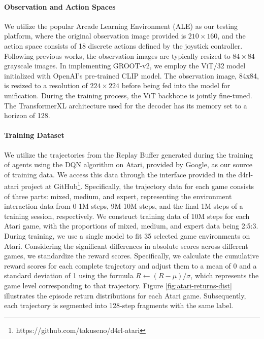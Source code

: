 \paragraph{Observation and Action Spaces} We utilize the popular Arcade Learning Environment (ALE) as our testing platform, where the original observation image provided is $210 \times 160$, and the action space consists of 18 discrete actions defined by the joystick controller. Following previous works, the observation images are typically resized to $84 \times 84$ grayscale images. In implementing GROOT-v2, we employ the ViT/32 model initialized with OpenAI's pre-trained CLIP model. The observation image, 84x84, is resized to a resolution of $224 \times 224$ before being fed into the model for unification. During the training process, the ViT backbone is jointly fine-tuned. The TransformerXL architecture used for the decoder has its memory set to a horizon of 128. 


\paragraph{Training Dataset} We utilize the trajectories from the Replay Buffer generated during the training of agents using the DQN algorithm on Atari, provided by Google, as our source of training data. We access this data through the interface provided in the d4rl-atari project at GitHub\footnote{https://github.com/takuseno/d4rl-atari}. Specifically, the trajectory data for each game consists of three parts: mixed, medium, and expert, representing the environment interaction data from 0-1M steps, 9M-10M steps, and the final 1M steps of a training session, respectively. We construct training data of 10M steps for each Atari game, with the proportions of mixed, medium, and expert data being 2:5:3. During training, we use a single model to fit 35 selected game environments on Atari. Considering the significant differences in absolute scores across different games, we standardize the reward scores. Specifically, we calculate the cumulative reward scores for each complete trajectory and adjust them to a mean of 0 and a standard deviation of 1 using the formula $R \leftarrow (R - \mu) /  \sigma$, which represents the game level corresponding to that trajectory. Figure \ref{fig:atari-returns-dist} illustrates the episode return distributions for each Atari game. Subsequently, each trajectory is segmented into 128-step fragments with the same label. 



